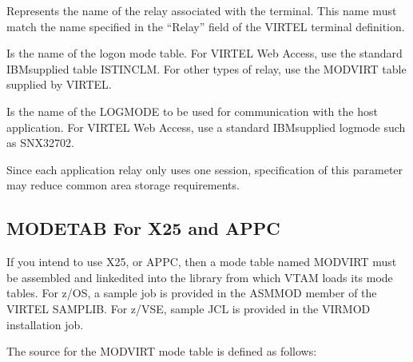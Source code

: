 \documentclass[letterpaper,10pt,english]{sphinxmanual}
\begin{document}
\begin{sphinxVerbatim}[commandchars=\\\{\}]
  
\end{sphinxVerbatim}

\sphinxAtStartPar
{} \sphinxhyphen{} Represents the name of the relay associated with the terminal. This name must match the name specified in the “Relay” field of the VIRTEL terminal definition.

\sphinxAtStartPar
{} \sphinxhyphen{} Is the name of the logon mode table. For VIRTEL Web Access, use the standard IBM\sphinxhyphen{}supplied table ISTINCLM. For other types of relay, use the MODVIRT table supplied by VIRTEL.

\sphinxAtStartPar
{} \sphinxhyphen{} Is the name of the LOGMODE to be used for communication with the host application. For VIRTEL Web Access, use a standard IBM\sphinxhyphen{}supplied logmode such as SNX32702.

\sphinxAtStartPar
{} \sphinxhyphen{} Since each application relay only uses one session, specification of this parameter may reduce common area storage requirements.

\ignorespaces 

\subsection{MODETAB For X25 and APPC}
\label{\detokenize{Installation_Guide:modetab-for-x25-and-appc}}\label{\detokenize{Installation_Guide:index-23}}
\sphinxAtStartPar
If you intend to use X25, or APPC, then a mode table named MODVIRT must be assembled and link\sphinxhyphen{}edited into the library from which VTAM loads its mode tables. For z/OS, a sample job is provided in the ASMMOD member of the VIRTEL SAMPLIB. For z/VSE, sample JCL is provided in the VIRMOD installation job.

\sphinxAtStartPar
The source for the MODVIRT mode table is defined as follows:
\end{document}
